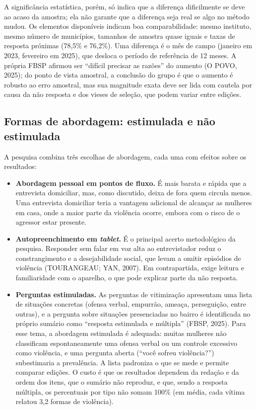 \documentclass[12pt,a4paper]{article}
\begin{document}
A significância estatística, porém, só indica que a diferença dificilmente se deve ao acaso da amostra; ela não garante que a diferença seja real se algo no método mudou. Os elementos disponíveis indicam boa comparabilidade: mesmo instituto, mesmo número de municípios, tamanhos de amostra quase iguais e taxas de resposta próximas (78,5\% e 76,2\%). Uma diferença é o mês de campo (janeiro em 2023, fevereiro em 2025), que desloca o período de referência de 12 meses. A própria FBSP afirmou ser ``difícil precisar as razões'' do aumento (O POVO, 2025); do ponto de vista amostral, a conclusão do grupo é que o aumento é robusto ao erro amostral, mas sua magnitude exata deve ser lida com cautela por causa da não resposta e dos vieses de seleção, que podem variar entre edições.

\subsection{Formas de abordagem: estimulada e não estimulada}

A pesquisa combina três escolhas de abordagem, cada uma com efeitos sobre os resultados:

\begin{itemize}
    \item \textbf{Abordagem pessoal em pontos de fluxo.} É mais barata e rápida que a entrevista domiciliar, mas, como discutido, deixa de fora quem circula menos. Uma entrevista domiciliar teria a vantagem adicional de alcançar as mulheres em casa, onde a maior parte da violência ocorre, embora com o risco de o agressor estar presente.
    \item \textbf{Autopreenchimento em \textit{tablet}.} É o principal acerto metodológico da pesquisa. Responder sem falar em voz alta ao entrevistador reduz o constrangimento e a desejabilidade social, que levam a omitir episódios de violência (TOURANGEAU; YAN, 2007). Em contrapartida, exige leitura e familiaridade com o aparelho, o que pode explicar parte da não resposta.
    \item \textbf{Perguntas estimuladas.} As perguntas de vitimização apresentam uma lista de situações concretas (ofensa verbal, empurrão, ameaça, perseguição, entre outras), e a pergunta sobre situações presenciadas no bairro é identificada no próprio sumário como ``resposta estimulada e múltipla'' (FBSP, 2025). Para esse tema, a abordagem estimulada é adequada: muitas mulheres não classificam espontaneamente uma ofensa verbal ou um controle excessivo como violência, e uma pergunta aberta (``você sofreu violência?'') subestimaria a prevalência. A lista padroniza o que se mede e permite comparar edições. O custo é que os resultados dependem da redação e da ordem dos itens, que o sumário não reproduz, e que, sendo a resposta múltipla, os percentuais por tipo não somam 100\% (em média, cada vítima relatou 3,2 formas de violência).
\end{itemize}
\end{document}
